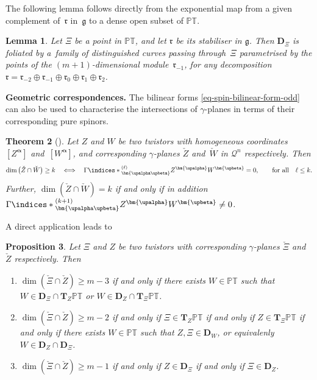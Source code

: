 \documentclass[pdftex]{sigma}
\numberwithin{equation}{section}
\newtheorem{Theorem}{Theorem}[section]
\newtheorem{Lemma}[Theorem]{Lemma}
\newtheorem{Proposition}[Theorem]{Proposition}
 { \theoremstyle{definition}
\newtheorem{Definition}[Theorem]{Definition}
\newtheorem{Example}[Theorem]{Example}
\newtheorem{Remark}[Theorem]{Remark} }
\newcommand{\mbf} [1]{\mathbf{#1}}
\newcommand{\mc} [1]{\mathcal{#1}}
\newcommand{\ind} {\indices}
\newcommand{\g} {\mathfrak{g}}
\newcommand{\mfr} {\mathfrak{r}}
\newcommand{\PT} {\mathbb{PT}}
\begin{document}
The following lemma follows directly from the exponential map from a given complement of~$\mfr$ in~$\g$ to a dense open subset of $\PT$.

\begin{Lemma}\label{lem-fol-D}
Let $\Xi$ be a point in $\PT$, and let $\mfr$ be its stabiliser in $\g$. Then $\mbf{D}_\Xi$ is foliated by a~family of distinguished curves passing through~$\Xi$ parametrised by the points of the $(m+1)$-dimensional module~$\mfr_{-1}$, for any decomposition $\mfr = \mfr_{-2} \oplus \mfr_{-1} \oplus \mfr_0 \oplus \mfr_1 \oplus \mfr_2$.
\end{Lemma}

{\bf Geometric correspondences.} The bilinear forms \eqref{eq-spin-bilinear-form-odd} can also be used to characterise the intersections of $\gamma$-planes in terms of their corresponding pure spinors.
\begin{Theorem}[\cite{Cartan1981,Harnad1995}]\label{thm-gam-inters}
Let $Z$ and $W$ be two twistors with homogeneous coordinates~$[Z^{\bm{\upalpha}}]$ and~$[W^{\bm{\upalpha}}]$, and corresponding $\gamma$-planes $\check{Z}$ and~$\check{W}$ in $\mc{Q}^n$ respectively. Then
\begin{gather*}
\dim \big( \check{Z} \cap \check{W} \big) \geq k \quad \Longleftrightarrow \quad \Gamma \ind*{^{(\ell)}_{\bm{\upalpha \upbeta}}} Z^{\bm{\upalpha}} W^{\bm{\upbeta}} = 0 , \qquad \mbox{for all} \quad \ell \leq k.
\end{gather*}
Further, $\dim ( \check{Z} \cap \check{W} ) = k$ if and only if in addition $\Gamma \ind*{^{(k+1)}_{\bm{\upalpha \upbeta}}} Z^{\bm{\upalpha}} W^{\bm{\upbeta}} \neq 0$.
\end{Theorem}
A direct application leads to
\begin{Proposition}\label{prop-XiZ}
Let $\Xi$ and $Z$ be two twistors with corresponding $\gamma$-planes $\check{\Xi}$ and $\check{Z}$ respectively. Then
\begin{enumerate}\itemsep=0pt
\item[$1.$] $\dim(\check{\Xi} \cap \check{Z}) \geq m-3$ if and only if there exists $W \in \PT$ such that $W \in \mbf{D}_\Xi \cap \mbf{T}_Z \PT$ or $W \in \mbf{D}_Z \cap \mbf{T}_\Xi \PT$.
\item[$2.$] $\dim(\check{\Xi} \cap \check{Z}) \geq m-2$ if and only if $\Xi \in \mbf{T}_Z \PT$ if and only if $Z \in \mbf{T}_\Xi \PT$ if and only if there exists $W \in \PT$ such that $Z, \Xi \in \mbf{D}_W$, or equivalenly $W \in \mbf{D}_Z \cap \mbf{D}_\Xi$.
\item[$3.$] $\dim(\check{\Xi} \cap \check{Z}) \geq m-1$ if and only if $Z \in \mbf{D}_\Xi$ if and only if $\Xi \in \mbf{D}_Z$.
\end{enumerate}
\end{Proposition}
\end{document}
